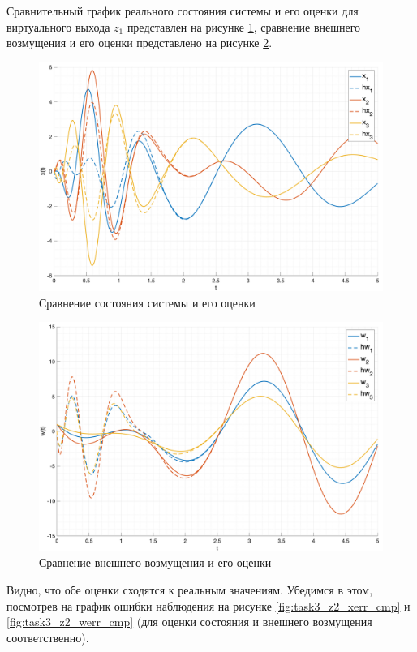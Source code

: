 Сравнительный график реального состояния системы и его оценки для виртуального выхода $z_1$
представлен на рисунке \ref{fig:task3_z2_x_cmp}, сравнение внешнего возмущения
и его оценки представлено на рисунке \ref{fig:task3_z2_w_cmp}.
\begin{figure}[ht!]
    \centering
    \includegraphics[width=\textwidth]{media/plots/task3_z2_x_cmp.png}
    \caption{Сравнение состояния системы и его оценки}
    \label{fig:task3_z2_x_cmp}
\end{figure}
\begin{figure}[ht!]
    \centering
    \includegraphics[width=\textwidth]{media/plots/task3_z2_w_cmp.png}
    \caption{Сравнение внешнего возмущения и его оценки}
    \label{fig:task3_z2_w_cmp}
\end{figure}
Видно, что обе оценки сходятся к реальным значениям. Убедимся в этом, посмотрев на график
ошибки наблюдения на рисунке \ref{fig:task3_z2_xerr_cmp} и \ref{fig:task3_z2_werr_cmp} (для оценки состояния и внешнего возмущения соответственно).

